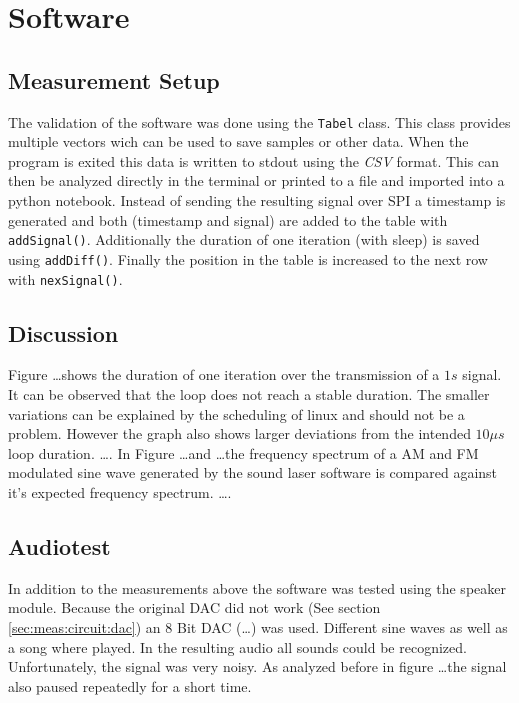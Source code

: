 \section{Software}

\subsection{Measurement Setup}

The validation of the software was done using the \lstinline{Tabel} class. This class provides multiple vectors wich can be used to save samples or other data. When the program is exited this data is written to stdout using the \textit{CSV} format. This can then be analyzed directly in the terminal or printed to a file and imported into a python notebook.\p
%
Instead of sending the resulting signal over SPI a timestamp is generated and both (timestamp and signal) are added to the table with \lstinline{addSignal()}. Additionally the duration of one iteration (with sleep) is saved using \lstinline{addDiff()}. Finally the position in the table is increased to the next row with \lstinline{nexSignal()}.

\subsection{Discussion}

Figure \dots shows the duration of one iteration over the transmission of a $1s$ signal. It can be observed that the loop does not reach a stable duration. The smaller variations can be explained by the scheduling of linux and should not be a problem. However the graph also shows larger deviations from the intended $10\mu s$ loop duration. \dots.
%
In Figure \dots and \dots the frequency spectrum of a AM and FM modulated sine wave generated by the sound laser software is compared against it's expected frequency spectrum. \dots.
%
\subsection{Audiotest}

In addition to the measurements above the software was tested using the speaker module. Because the original DAC did not work (See section \ref{sec:meas:circuit:dac}) an 8 Bit DAC (\dots) was used. Different sine waves as well as a song where played. In the resulting audio all sounds could be recognized. Unfortunately, the signal was very noisy. As analyzed before in figure \dots the signal also paused repeatedly for a short time.